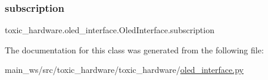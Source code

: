 \subsubsection{\texorpdfstring{subscription}{subscription}}
{\footnotesize\ttfamily toxic\+\_\+hardware.\+oled\+\_\+interface.\+Oled\+Interface.\+subscription}



The documentation for this class was generated from the following file\+:\begin{DoxyCompactItemize}
\item 
main\+\_\+ws/src/toxic\+\_\+hardware/toxic\+\_\+hardware/\mbox{\hyperlink{oled__interface_8py}{oled\+\_\+interface.\+py}}\end{DoxyCompactItemize}
